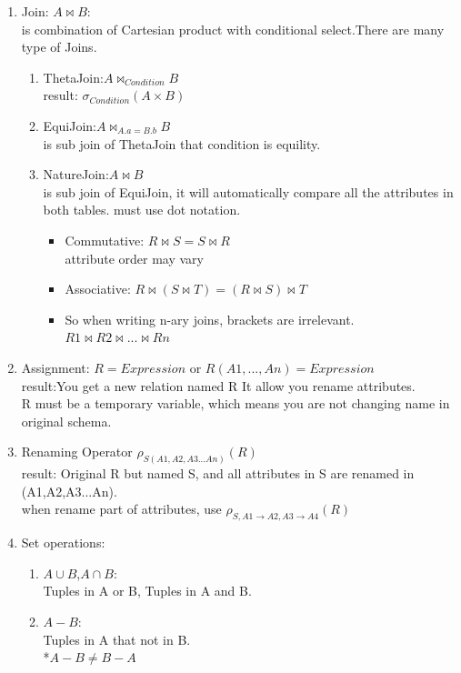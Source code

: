 \begin{enumerate}
    \item Join: $A\bowtie B$:
    \\is combination of Cartesian product with conditional select.There are many type of Joins.\begin{enumerate}
        \item ThetaJoin:$A\bowtie _{Condition}B$\\
        result: $\sigma _{Condition} (A\times B)$
        \item EquiJoin:$A\bowtie _{A.a=B.b}B$\\
        is sub join of ThetaJoin that condition is equility.
        \item NatureJoin:$A\bowtie B$\\
        is sub join of EquiJoin, it will automatically compare all the attributes in both tables. must use dot notation.
        \begin{itemize}
            \item Commutative: $R \bowtie S = S \bowtie R$ \\
            attribute order may vary
            \item Associative: $R \bowtie (S \bowtie T) = (R \bowtie S) \bowtie T$
            \item So when writing n-ary joins, brackets are irrelevant.\\ $R1 \bowtie R2 \bowtie . . . \bowtie Rn $
        \end{itemize}
    \end{enumerate}
    \item Assignment: $ R = Expression$ or $R{(A1, ..., An) }=Expression$\\
    result:You get a new relation named R It allow you rename attributes. \\R must be a temporary variable, which means you are not changing name in original schema.
    \item Renaming Operator $\rho _{S(A1,A2,A3...An)}(R)$\\
    result: Original R but named S, and all attributes in S are renamed in (A1,A2,A3...An).\\
    when rename part of attributes, use $\rho _{S,A1\rightarrow A2,A3\rightarrow A4}(R)$
    \item Set operations:\begin{enumerate}
        \item $A\cup B$,$A\cap B$: \\Tuples in A or B, Tuples in A and B.
        \item $A-B$: \\Tuples in A that not in B. \\*$A-B\ne B-A$

\end{enumerate}
\end{enumerate}
